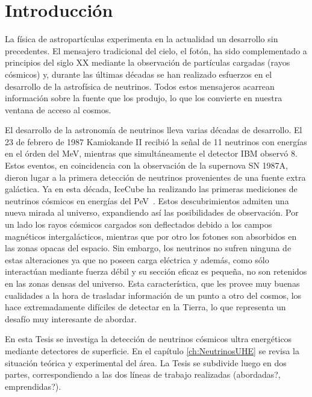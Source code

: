 \chapter{Introducci\'on}
\label{ch:intro}

La f\'isica de astropart\'iculas experimenta en la actualidad un desarrollo sin precedentes. 
El mensajero tradicional del cielo, el fot\'on, ha sido complementado a principios del siglo XX mediante la observaci\'on de part\'iculas cargadas (rayos c\'osmicos) y, durante las \'ultimas d\'ecadas se han realizado esfuerzos en el desarrollo de la astrof\'isica de neutrinos.
Todos estos mensajeros acarrean informaci\'on sobre la fuente que los produjo, lo que los convierte en nuestra ventana de acceso al cosmos.

El desarrollo de la astronom\'ia de neutrinos lleva varias d\'ecadas de desarrollo. 
El 23 de febrero de 1987 Kamiokande II recibi\'o la se\~nal de 11 neutrinos con energ\'ias en el \'orden del MeV, mientras que simult\'aneamente el detector IBM observ\'o 8.
Estos eventos, en coincidencia con la observaci\'on de la supernova SN 1987A, dieron lugar a la primera detecci\'on de neutrinos provenientes de una fuente extra gal\'actica.
Ya en esta d\'ecada, IceCube ha realizando las primeras mediciones de neutrinos c\'osmicos en energ\'ias del PeV~\cite{cite:IceCube1}.
Estos descubrimientos admiten una nueva mirada al universo, expandiendo as\'i las posibilidades de observaci\'on.
Por un lado los rayos c\'osmicos cargados son deflectados debido a los campos magn\'eticos intergal\'acticos, mientras que por otro los fotones son absorbidos en las zonas opacas del espacio. 
Sin embargo, los neutrinos no sufren ninguna de estas alteraciones ya que no poseen carga el\'ectrica y adem\'as, como s\'olo interact\'uan mediante fuerza d\'ebil y su secci\'on eficaz es peque\~na, no son retenidos en las zonas densas del universo.
Esta caracter\'istica, que les provee muy buenas cualidades a la hora de trasladar informaci\'on de un punto a otro del cosmos, los hace extremadamente dif\'iciles de detectar en la Tierra, lo que representa un desaf\'io muy interesante de abordar.

En esta Tesis se investiga la detecci\'on de neutrinos c\'osmicos ultra energ\'eticos mediante detectores de superficie.  En el cap\'itulo \ref{ch:NeutrinosUHE} se revisa la situaci\'on te\'orica y experimental del \'area. La Tesis se subdivide luego en dos partes, correspondiendo a las dos líneas de trabajo realizadas (abordadas?, emprendidas?).

